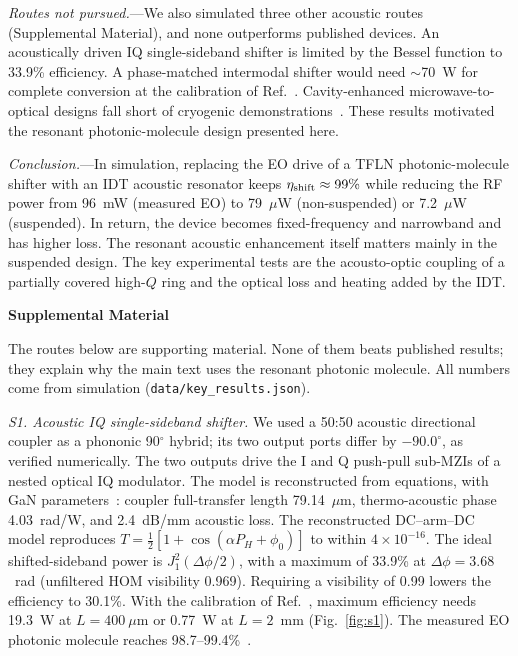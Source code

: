 \documentclass[aps,prl,reprint,superscriptaddress,amsmath,amssymb,floatfix]{revtex4-2}
\newcommand{\etash}{\eta_{\rm shift}}
\begin{document}
\emph{Routes not pursued.}---We also simulated three other acoustic routes (Supplemental Material), and none outperforms published devices. An acoustically driven IQ single-sideband shifter is limited by the Bessel function to 33.9\% efficiency. A phase-matched intermodal shifter would need $\sim$70~W for complete conversion at the calibration of Ref.~\cite{Shao2020}. Cavity-enhanced microwave-to-optical designs fall short of cryogenic demonstrations~\cite{Weaver2024,Jiang2023,Warner2025,Mirhosseini2020}. These results motivated the resonant photonic-molecule design presented here.

\emph{Conclusion.}---In simulation, replacing the EO drive of a TFLN photonic-molecule shifter with an IDT acoustic resonator keeps $\etash\approx99\%$ while reducing the RF power from 96~mW (measured EO) to 79~$\mu$W (non-suspended) or 7.2~$\mu$W (suspended). In return, the device becomes fixed-frequency and narrowband and has higher loss. The resonant acoustic enhancement itself matters mainly in the suspended design. The key experimental tests are the acousto-optic coupling of a partially covered high-$Q$ ring and the optical loss and heating added by the IDT.



\clearpage
\onecolumngrid
\begin{center}\textbf{\large Supplemental Material}\end{center}
\setcounter{figure}{0}
\setcounter{table}{0}
\setcounter{equation}{0}

The routes below are supporting material. None of them beats published results; they explain why the main text uses the resonant photonic molecule. All numbers come from simulation (\texttt{data/key\_results.json}).

\emph{S1. Acoustic IQ single-sideband shifter.} We used a 50:50 acoustic directional coupler as a phononic 90$^\circ$ hybrid; its two output ports differ by $-90.0^\circ$, as verified numerically. The two outputs drive the I and Q push-pull sub-MZIs of a nested optical IQ modulator. The model is reconstructed from equations, with GaN parameters~\cite{Xu2025}: coupler full-transfer length 79.14~$\mu$m, thermo-acoustic phase 4.03~rad/W, and 2.4~dB/mm acoustic loss. The reconstructed DC--arm--DC model reproduces $T=\tfrac12[1+\cos(\alpha P_H+\phi_0)]$ to within $4\times10^{-16}$. The ideal shifted-sideband power is $J_1^2(\Delta\phi/2)$, with a maximum of 33.9\% at $\Delta\phi=3.68$~rad (unfiltered HOM visibility 0.969). Requiring a visibility of 0.99 lowers the efficiency to 30.1\%. With the calibration of Ref.~\cite{Ni2026}, maximum efficiency needs 19.3~W at $L=400~\mu$m or 0.77~W at $L=2$~mm (Fig.~\ref{fig:s1}). The measured EO photonic molecule reaches 98.7--99.4\%~\cite{Hu2021}.
\end{document}
